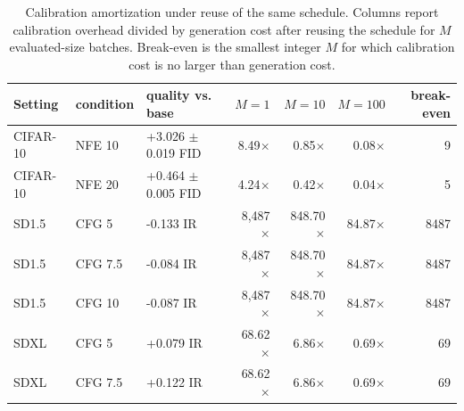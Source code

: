 \begin{table}[t]
  \centering
  \caption{Calibration amortization under reuse of the same schedule.
  Columns report calibration overhead divided by generation cost after
  reusing the schedule for $M$ evaluated-size batches. Break-even is the
  smallest integer $M$ for which calibration cost is no larger than
  generation cost.}
  \label{tab:calibration-amortization-summary}
  \small
  \begin{tabular}{lllrrrr}
    \toprule
    Setting & condition & quality vs. base & $M=1$ & $M=10$ & $M=100$ & break-even \\
    \midrule
    CIFAR-10 & NFE 10 & +3.026 $\pm$ 0.019 FID & 8.49$\times$ & 0.85$\times$ & 0.08$\times$ & 9 \\
    CIFAR-10 & NFE 20 & +0.464 $\pm$ 0.005 FID & 4.24$\times$ & 0.42$\times$ & 0.04$\times$ & 5 \\
    SD1.5 & CFG 5 & -0.133 IR & 8{,}487$\times$ & 848.70$\times$ & 84.87$\times$ & 8487 \\
    SD1.5 & CFG 7.5 & -0.084 IR & 8{,}487$\times$ & 848.70$\times$ & 84.87$\times$ & 8487 \\
    SD1.5 & CFG 10 & -0.087 IR & 8{,}487$\times$ & 848.70$\times$ & 84.87$\times$ & 8487 \\
    SDXL & CFG 5 & +0.079 IR & 68.62$\times$ & 6.86$\times$ & 0.69$\times$ & 69 \\
    SDXL & CFG 7.5 & +0.122 IR & 68.62$\times$ & 6.86$\times$ & 0.69$\times$ & 69 \\
    \bottomrule
  \end{tabular}
\end{table}
